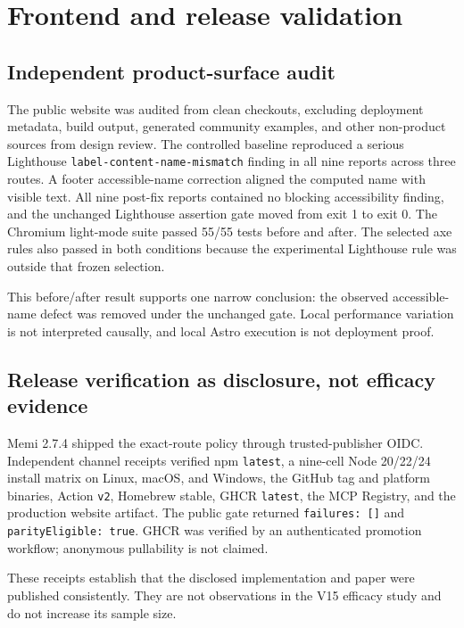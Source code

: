 \documentclass[9pt,twocolumn]{extarticle}
\begin{document}
\section{Frontend and release validation}

\subsection{Independent product-surface audit}

The public website was audited from clean checkouts, excluding deployment
metadata, build output, generated community examples, and other non-product
sources from design review. The controlled baseline reproduced a serious
Lighthouse \texttt{label-content-name-mismatch} finding in all nine reports
across three routes. A footer accessible-name correction aligned the computed
name with visible text. All nine post-fix reports contained no blocking
accessibility finding, and the unchanged Lighthouse assertion gate moved from
exit 1 to exit 0. The Chromium light-mode suite passed 55/55 tests before and
after. The selected axe rules also passed in both conditions because the
experimental Lighthouse rule was outside that frozen selection.

This before/after result supports one narrow conclusion: the observed accessible-
name defect was removed under the unchanged gate. Local performance variation
is not interpreted causally, and local Astro execution is not deployment proof.

\subsection{Release verification as disclosure, not efficacy evidence}

Memi 2.7.4 shipped the exact-route policy through trusted-publisher OIDC.
Independent channel receipts verified npm \texttt{latest}, a nine-cell Node
20/22/24 install matrix on Linux, macOS, and Windows, the GitHub tag and platform
binaries, Action \texttt{v2}, Homebrew stable, GHCR \texttt{latest}, the MCP
Registry, and the production website artifact. The public gate returned
\texttt{failures: []} and \texttt{parityEligible: true}. GHCR was verified by
an authenticated promotion workflow; anonymous pullability is not claimed.

These receipts establish that the disclosed implementation and paper were
published consistently. They are not observations in the V15 efficacy study
and do not increase its sample size.
\end{document}

